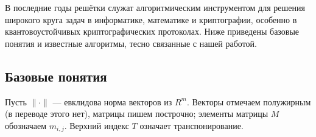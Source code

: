 
В последние годы решётки служат алгоритмическим инструментом для решения
широкого круга задач в информатике, математике и криптографии, особенно в
квантовоустойчивых криптографических протоколах. Ниже приведены базовые понятия
и известные алгоритмы, тесно связанные с нашей работой.

\subsection*{Базовые понятия}

Пусть $\lVert\cdot\rVert$ — евклидова норма векторов из $R^{m}$. Векторы
отмечаем полужирным (в переводе этого нет), матрицы пишем построчно; элементы
матрицы $M$ обозначаем $m_{i,j}$. Верхний индекс $T$ означает транспонирование.

